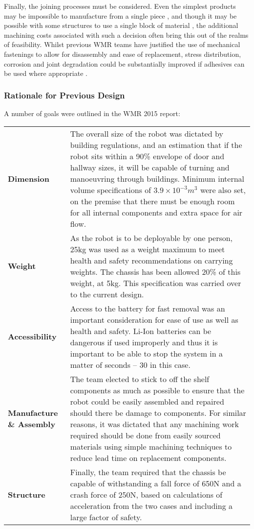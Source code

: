 Finally, the joining processes must be considered. Even the simplest products may be impossible to manufacture from a single piece \cite{Kalpakjian10}, and though it may be possible with some structures to use a single block of material \cite{mcclean08}, the additional machining costs associated with such a decision often bring this out of the realms of feasibility. Whilst previous WMR teams have justified the use of mechanical fastenings to allow for disassembly and ease of replacement, stress distribution, corrosion and joint degradation could be substantially improved if adhesives can be used where appropriate \cite{Davies12}.

\subsubsection{Rationale for Previous Design}

A number of goals were outlined in the WMR 2015 report:\par

\begin{longtable}{p{} p{}}
\textbf{Dimension} &
The overall size of the robot was dictated by building regulations, and an estimation that if the robot sits within a 90\% envelope of door and hallway sizes, it will be capable of turning and manoeuvring through buildings. Minimum internal volume specifications of $3.9 \times 10^{-3} m^3$ were also set, on the premise that there must be enough room for all internal components and extra space for air flow.\\
\textbf{Weight} &
As the robot is to be deployable by one person, 25kg was used as a weight maximum to meet health and safety recommendations on carrying weights. The chassis has been allowed 20\% of this weight, at 5kg. This specification was carried over to the current design.\\
\textbf{Accessibility} &
Access to the battery for fast removal was an important consideration for ease of use as well as health and safety. Li-Ion batteries can be dangerous if used improperly and thus it is important to be able to stop the system in a matter of seconds – 30 in this case.\\
\textbf{Manufacture \& Assembly} &
The team elected to stick to off the shelf components as much as possible to ensure that the robot could be easily assembled and repaired should there be damage to components. For similar reasons, it was dictated that any machining work required should be done from easily sourced materials using simple machining techniques to reduce lead time on replacement components.\\
\textbf{Structure } &
Finally, the team required that the chassis be capable of withstanding a fall force of 650N and a crash force of 250N, based on calculations of acceleration from the two cases and including a large factor of safety.\\
\end{longtable}


